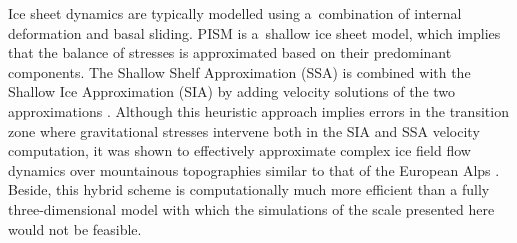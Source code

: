 \documentclass[tc, manuscript]{copernicus}
\begin{document}
    Ice sheet dynamics are typically modelled using a~combination of internal
    deformation and basal sliding. PISM is a~shallow ice sheet model, which
    implies that the balance of stresses is approximated based on their
    predominant components. The Shallow Shelf Approximation (SSA) is combined
    with the Shallow Ice Approximation (SIA) by adding velocity solutions of
    the two approximations \citep[Eqs.~7--9 and 15]{Winkelmann.etal.2011}.
    Although this heuristic approach implies errors in the transition zone
    where gravitational stresses intervene both in the SIA and SSA velocity
    computation, it was shown to effectively approximate complex ice field flow
    dynamics over mountainous topographies similar to that of the European Alps
    \citep{Golledge.etal.2012, Ziemen.etal.2016}. Beside, this hybrid scheme is
    computationally much more efficient than a fully three-dimensional model
    with which the simulations of the scale presented here would not be
    feasible.
\end{document}
